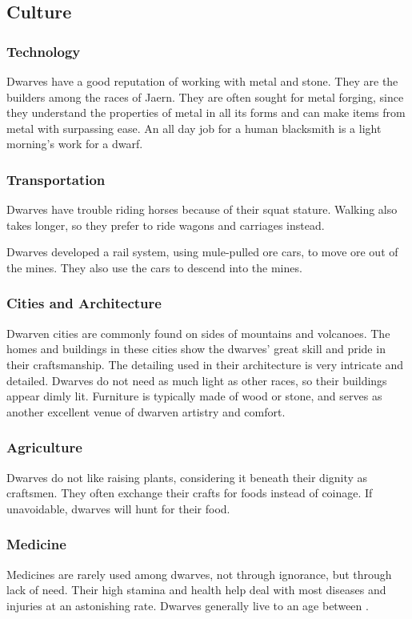 \begin{multicols*}{2}
\subsection{Culture}
\subsubsection{Technology}
Dwarves have a good reputation of working with metal and stone. They are the builders among the races of Jaern. They are often sought for metal forging, since they understand the properties of metal in all its forms and can make items from metal with surpassing ease. An all day job for a human blacksmith is a light morning's work for a dwarf.
\subsubsection{Transportation}
Dwarves have trouble riding horses because of their squat stature. Walking also takes longer, so they prefer to ride wagons and carriages instead. 

Dwarves developed a rail system, using mule-pulled ore cars, to move ore out of the mines. They also use the cars to descend into the mines.
\subsubsection{Cities and Architecture}
Dwarven cities are commonly found on sides of mountains and volcanoes. The homes and buildings in these cities show the dwarves' great skill and pride in their craftsmanship. The detailing used in their architecture is very intricate and detailed. Dwarves do not need as much light as other races, so their buildings appear dimly lit. Furniture is typically made of wood or stone, and serves as another excellent venue of dwarven artistry and comfort.
\subsubsection{Agriculture}
Dwarves do not like raising plants, considering it beneath their dignity as craftsmen. They often exchange their crafts for foods instead of coinage. If unavoidable, dwarves will hunt for their food.
\subsubsection{Medicine}
Medicines are rarely used among dwarves, not through ignorance, but through lack of need. Their high stamina and health help deal with most diseases and injuries at an astonishing rate. Dwarves generally live to an age between .

\end{multicols*}
